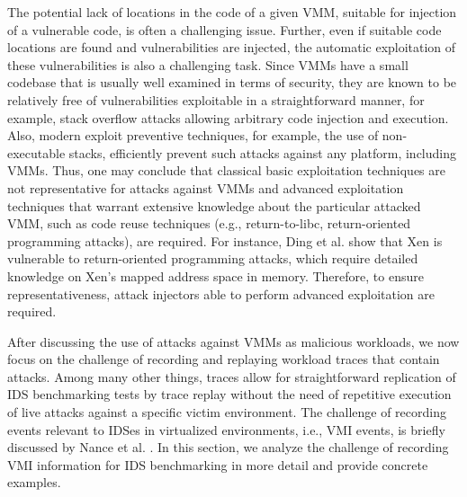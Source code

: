 The potential lack of locations in the code of a given VMM, suitable for injection of a vulnerable code, is often a challenging issue.  Further, even if suitable code locations are found and vulnerabilities are injected, the automatic exploitation of these vulnerabilities is also a challenging task. Since VMMs have a small codebase that is usually well examined in terms of security, they are known to be relatively free of vulnerabilities exploitable in a straightforward manner, for example, stack overflow attacks allowing arbitrary code injection and execution. Also, modern exploit preventive techniques, for example, the use of non-executable stacks, efficiently prevent such attacks against any platform, including VMMs. Thus, one may conclude that classical basic exploitation techniques are not representative for attacks against VMMs and advanced exploitation techniques that warrant extensive knowledge about the particular attacked VMM, such as code reuse techniques (e.g., return-to-libc, return-oriented programming attacks), are required. For instance, Ding et al. \cite{ding:return_oriented} show that Xen is vulnerable to return-oriented programming attacks, which require detailed knowledge on Xen's mapped address space in memory. Therefore, to ensure representativeness, attack injectors able to perform advanced exploitation are required.   

After discussing the use of attacks against VMMs as malicious workloads, we now focus on the challenge of recording and replaying workload traces that contain attacks. Among many other things, traces allow for straightforward replication of IDS benchmarking tests by trace replay without the need of repetitive execution of live attacks against a specific victim environment. The challenge of recording events relevant to IDSes in virtualized environments, i.e., VMI events, is briefly discussed by Nance et al. \cite{nance:virtual}. In this section, we analyze the challenge of recording VMI information for IDS benchmarking in more detail and provide concrete examples. 

